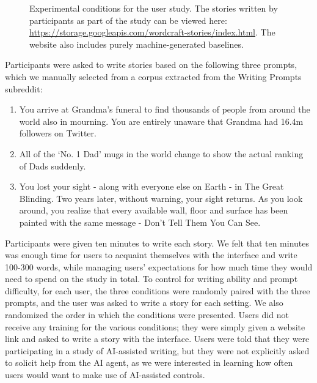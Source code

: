 \begin{figure}[tbp]
  \centering
  \caption{Experimental conditions for the user study. The stories written by participants as part of the study can be viewed here: \href{https://storage.googleapis.com/wordcraft-stories/index.html}{https://storage.googleapis.com/wordcraft-stories/index.html}. The website also includes purely machine-generated baselines.}
  \label{fig:conditions}
\end{figure}

\noindent Participants were asked to write stories based on the following three prompts, which we manually selected from a corpus extracted from the Writing Prompts subreddit:
\begin{enumerate}
    \item You arrive at Grandma's funeral to find thousands of people from around the world also in mourning. You are entirely unaware that Grandma had 16.4m followers on Twitter.
    \item All of the `No. 1 Dad' mugs in the world change to show the actual ranking of Dads suddenly.
    \item You lost your sight - along with everyone else on Earth - in The Great Blinding. Two years later, without warning, your sight returns. As you look around, you realize that every available wall, floor and surface has been painted with the same message - Don't Tell Them You Can See.
\end{enumerate}

\noindent Participants were given ten minutes to write each story.
We felt that ten minutes was enough time for users to acquaint themselves with the interface and write 100-300 words, while managing users' expectations for how much time they would need to spend on the study in total.
To control for writing ability and prompt difficulty, for each user, the three conditions were randomly paired with the three prompts, and the user was asked to write a story for each setting.
We also randomized the order in which the conditions were presented.
Users did not receive any training for the various conditions; they were simply given a website link and asked to write a story with the interface.
Users were told that they were participating in a study of AI-assisted writing, but they were not explicitly asked to solicit help from the AI agent, as we were interested in learning how often users would want to make use of AI-assisted controls.


